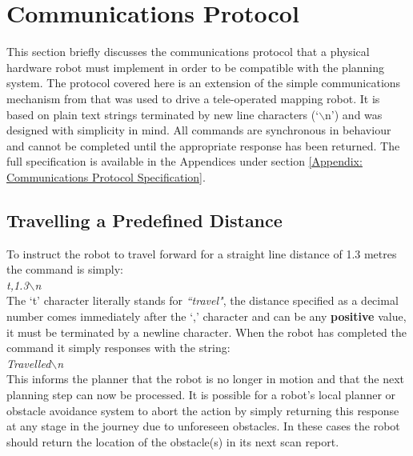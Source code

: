 \newpage


\section{Communications Protocol}\label{sec:protocol}
\noindent
This section briefly discusses the communications protocol that a physical hardware robot must implement in order to be compatible with the planning system. The protocol covered here is an extension of the simple communications mechanism from \cite{JMD14} that was used to drive a tele-operated mapping robot. It is based on plain text strings terminated by new line characters (`$\backslash$n') and was designed with simplicity in mind. All commands are synchronous in behaviour and cannot be completed until the appropriate response has been returned. The full specification is available in the Appendices under section \ref{Appendix: Communications Protocol Specification}.

\subsection{Travelling a Predefined Distance}
\noindent
To instruct the robot to travel forward for a straight line distance of 1.3 metres the command is simply: \\

\textit{t,1.3$\backslash$n} \\

\noindent
The `t' character literally stands for \textit{``travel"}, the distance specified as a decimal number comes immediately after the `,' character and can be any \textbf{positive} value, it must be terminated by a newline character. When the robot has completed the command it simply responses with the string: \\

\textit{Travelled$\backslash$n} \\

\noindent
This informs the planner that the robot is no longer in motion and that the next planning step can now be processed. It is possible for a robot's local planner or obstacle avoidance system to abort the action by simply returning this response at any stage in the journey due to unforeseen obstacles. In these cases the robot should return the location of the obstacle(s) in its next scan report.

